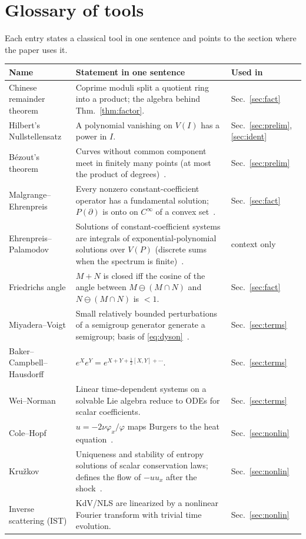\documentclass[11pt,a4paper]{article}
\theoremstyle{definition}
\newcommand{\Var}{V}
\begin{document}
\clearpage
\appendix
\section{Glossary of tools}\label{app:gloss}
Each entry states a classical tool in one sentence and points to the section where the paper uses it.
\begin{center}\small
\begin{tabular}{@{}L{3.4cm}L{9.2cm}L{2.0cm}@{}}
\toprule
Name & Statement in one sentence & Used in\\\midrule
Chinese remainder theorem & Coprime moduli split a quotient ring into a product; the algebra behind Thm.~\ref{thm:factor}. & Sec.~\ref{sec:fact}\\
Hilbert's Nullstellensatz & A polynomial vanishing on $\Var(I)$ has a power in $I$. & Sec.~\ref{sec:prelim}, \ref{sec:ident}\\
B\'ezout's theorem & Curves without common component meet in finitely many points (at most the product of degrees)~\cite{fu}. & Sec.~\ref{sec:prelim}\\
Malgrange--Ehrenpreis & Every nonzero constant-coefficient operator has a fundamental solution; $P(\partial)$ is onto on $C^\infty$ of a convex set~\cite{eh,ma}. & Sec.~\ref{sec:fact}\\
Ehrenpreis--Palamodov & Solutions of constant-coefficient systems are integrals of exponential-polynomial solutions over $\Var(P)$ (discrete sums when the spectrum is finite)~\cite{pa}. & context only\\
Friedrichs angle & $M+N$ is closed iff the cosine of the angle between $M\ominus(M\cap N)$ and $N\ominus(M\cap N)$ is $<1$. & Sec.~\ref{sec:fact}\\
Miyadera--Voigt & Small relatively bounded perturbations of a semigroup generator generate a semigroup; basis of \eqref{eq:dyson}~\cite{en}. & Sec.~\ref{sec:terms}\\
Baker--Campbell--Hausdorff & $e^Xe^Y=e^{X+Y+\frac12[X,Y]+\cdots}$. & Sec.~\ref{sec:terms}\\
Wei--Norman & Linear time-dependent systems on a solvable Lie algebra reduce to ODEs for scalar coefficients. & Sec.~\ref{sec:terms}\\
Cole--Hopf & $u=-2\nu\varphi_x/\varphi$ maps Burgers to the heat equation~\cite{ch}. & Sec.~\ref{sec:nonlin}\\
Kru\v zkov & Uniqueness and stability of entropy solutions of scalar conservation laws; defines the flow of $-uu_x$ after the shock~\cite{kr}. & Sec.~\ref{sec:nonlin}\\
Inverse scattering (IST) & KdV/NLS are linearized by a nonlinear Fourier transform with trivial time evolution. & Sec.~\ref{sec:nonlin}\\
\bottomrule
\end{tabular}
\end{center}
\end{document}
